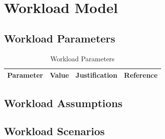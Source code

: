 \section{Workload Model}



\subsection{Workload Parameters}


\begin{table}[H]
\centering
\caption{Workload Parameters}
\label{tab:workload-parameters}

\begin{tabular}{|p{3.5cm}|p{2.5cm}|p{5cm}|p{3cm}|}
\hline
\textbf{Parameter} &
\textbf{Value} &
\textbf{Justification} &
\textbf{Reference} \\
\hline


\hline


\hline


\hline


\hline

\end{tabular}
\end{table}


\subsection{Workload Assumptions}



\subsection{Workload Scenarios}

